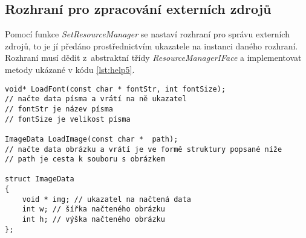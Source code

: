 \documentclass{article}
\begin{document}
\subsection{\label{SEC:resI}Rozhraní pro zpracování externích zdrojů}
Pomocí funkce \textit{SetResourceManager} se nastaví rozhraní pro správu externích zdrojů, to je jí předáno prostřednictvím ukazatele na instanci daného rozhraní. Rozhraní musí dědit z~abstraktní třídy \textit{ResourceManagerIFace} a implementovat metody ukázané v kódu \ref{lst:help5}.
\begin{lstlisting}[frame=single,caption=Metody rozhraní pro správu externích zdrojů.,label=lst:help5]
void* LoadFont(const char * fontStr, int fontSize);
// načte data písma a vrátí na ně ukazatel
// fontStr je název písma
// fontSize je velikost písma

ImageData LoadImage(const char *  path);
// načte data obrázku a vrátí je ve formě struktury popsané níže
// path je cesta k souboru s obrázkem

struct ImageData
{
	void * img; // ukazatel na načtená data
	int w; // šířka načteného obrázku
	int h; // výška načteného obrázku
};
\end{lstlisting}
\end{document}
